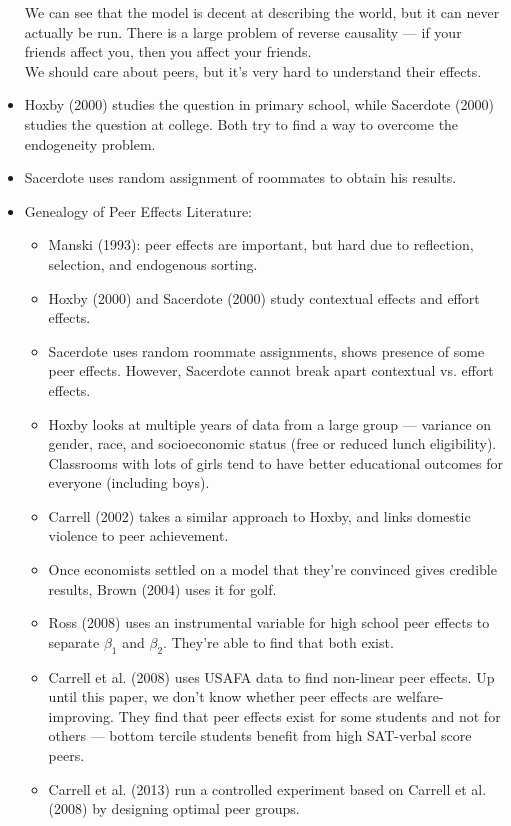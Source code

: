 \documentclass[10pt]{extarticle}
\begin{document}
\begin{itemize}
      We can see that the model is decent at describing the world, but it can never actually be run. There is a large problem of reverse causality --- if your friends affect you, then you affect your friends.\\

      We should care about peers, but it's very hard to understand their effects.
    \item Hoxby (2000) studies the question in primary school, while Sacerdote (2000) studies the question at college. Both try to find a way to overcome the endogeneity problem.
    \item Sacerdote uses random assignment of roommates to obtain his results.
    \item Genealogy of Peer Effects Literature:
      \begin{itemize}
        \item Manski (1993): peer effects are important, but hard due to reflection, selection, and endogenous sorting.
        \item Hoxby (2000) and Sacerdote (2000) study contextual effects and effort effects.
        \item Sacerdote uses random roommate assignments, shows presence of some peer effects. However, Sacerdote cannot break apart contextual vs. effort effects.
        \item Hoxby looks at multiple years of data from a large group --- variance on gender, race, and socioeconomic status (free or reduced lunch eligibility). Classrooms with lots of girls tend to have better educational outcomes for everyone (including boys).
        \item Carrell (2002) takes a similar approach to Hoxby, and links domestic violence to peer achievement.
        \item Once economists settled on a model that they're convinced gives credible results, Brown (2004) uses it for golf.
        \item Ross (2008) uses an instrumental variable for high school peer effects to separate $\beta_1$ and $\beta_2$. They're able to find that both exist.
        \item Carrell et al. (2008) uses USAFA data to find non-linear peer effects. Up until this paper, we don't know whether peer effects are welfare-improving. They find that peer effects exist for some students and not for others --- bottom tercile students benefit from high SAT-verbal score peers.
        \item Carrell et al. (2013) run a controlled experiment based on Carrell et al. (2008) by designing optimal peer groups.
      \end{itemize}
  \end{itemize}
\end{document}
